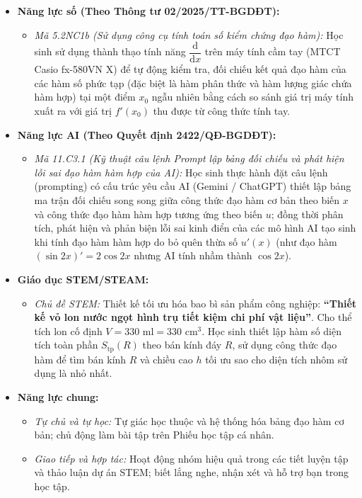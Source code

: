 \documentclass[12pt, a4paper]{article}
\begin{document}
\begin{itemize}[leftmargin=1.2cm]
    \item \textbf{Năng lực số (Theo Thông tư 02/2025/TT-BGDĐT):}
    \begin{itemize}[leftmargin=0.6cm]
        \item \textit{Mã 5.2NC1b (Sử dụng công cụ tính toán số kiểm chứng đạo hàm):} Học sinh sử dụng thành thạo tính năng $\dfrac{\mathrm{d}}{\mathrm{d}x}$ trên máy tính cầm tay (MTCT Casio fx-580VN X) để tự động kiểm tra, đối chiếu kết quả đạo hàm của các hàm số phức tạp (đặc biệt là hàm phân thức và hàm lượng giác chứa hàm hợp) tại một điểm $x_0$ ngẫu nhiên bằng cách so sánh giá trị máy tính xuất ra với giá trị $f'(x_0)$ thu được từ công thức tính tay.
    \end{itemize}

    \item \textbf{Năng lực AI (Theo Quyết định 2422/QĐ-BGDĐT):}
    \begin{itemize}[leftmargin=0.6cm]
        \item \textit{Mã 11.C3.1 (Kỹ thuật câu lệnh Prompt lập bảng đối chiếu và phát hiện lỗi sai đạo hàm hàm hợp của AI):} Học sinh thực hành đặt câu lệnh (prompting) có cấu trúc yêu cầu AI (Gemini / ChatGPT) thiết lập bảng ma trận đối chiếu song song giữa công thức đạo hàm cơ bản theo biến $x$ và công thức đạo hàm hàm hợp tương ứng theo biến $u$; đồng thời phân tích, phát hiện và phản biện lỗi sai kinh điển của các mô hình AI tạo sinh khi tính đạo hàm hàm hợp do bỏ quên thừa số $u'(x)$ (như đạo hàm $(\sin 2x)' = 2\cos 2x$ nhưng AI tính nhầm thành $\cos 2x$).
    \end{itemize}

    \item \textbf{Giáo dục STEM/STEAM:}
    \begin{itemize}[leftmargin=0.6cm]
        \item \textit{Chủ đề STEM:} Thiết kế tối ưu hóa bao bì sản phẩm công nghiệp: \textbf{``Thiết kế vỏ lon nước ngọt hình trụ tiết kiệm chi phí vật liệu''}. Cho thể tích lon cố định $V = 330\text{ ml} = 330\text{ cm}^3$. Học sinh thiết lập hàm số diện tích toàn phần $S_{\text{tp}}(R)$ theo bán kính đáy $R$, sử dụng công thức đạo hàm để tìm bán kính $R$ và chiều cao $h$ tối ưu sao cho diện tích nhôm sử dụng là nhỏ nhất.
    \end{itemize}

    \item \textbf{Năng lực chung:}
    \begin{itemize}[leftmargin=0.6cm]
        \item \textit{Tự chủ và tự học:} Tự giác học thuộc và hệ thống hóa bảng đạo hàm cơ bản; chủ động làm bài tập trên Phiếu học tập cá nhân.
        \item \textit{Giao tiếp và hợp tác:} Hoạt động nhóm hiệu quả trong các tiết luyện tập và thảo luận dự án STEM; biết lắng nghe, nhận xét và hỗ trợ bạn trong học tập.
    \end{itemize}
\end{itemize}
\end{document}
